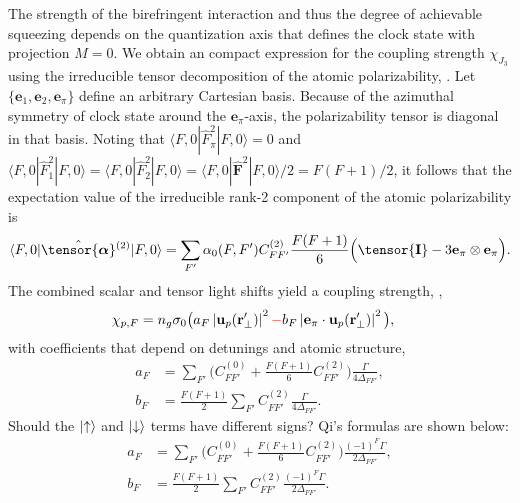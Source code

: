 \documentclass[preprint, aps,pra,onecolumn]{revtex4-1} %
\newcommand{\unittens}{\tensor{\mathbf{I}}}
\newcommand{\poltens}{\hat{\tensor{\boldsymbol{\alpha}}}}
\newcommand{\qaxis}{\mathbf{e}_\pi}
\newcommand{\chieff}{\chi_{J_3}}
\newcommand{\comment}[1]{{\color{Maroon} #1}}
\newcommand{\error}[1]{{\color{red} #1}}
\begin{document}
The strength of the birefringent interaction and thus the degree of achievable squeezing depends on the quantization axis that defines the clock state with projection $M=0$.  We obtain an compact expression for the coupling strength $\chieff$ using the irreducible tensor decomposition of the atomic polarizability, .  
Let $\{\mathbf{e}_1,\mathbf{e}_2, \mathbf{e}_\pi\}$ define an arbitrary Cartesian basis.  Because of the azimuthal symmetry of clock state around the $\qaxis$-axis, the polarizability tensor is diagonal in that basis.  
Noting that $\langle F,0 | \hat{F}_{\pi}^2| F,0 \rangle =0$ and $\langle F,0 | \hat{F}_{1}^2| F,0 \rangle = \langle F,0 | \hat{F}_{2}^2| F,0 \rangle = \langle F,0 | \hat{\mathbf{F}}^2| F,0 \rangle /2 =F(F+1)/2$, it follows that the expectation value of the irreducible rank-2 component of the atomic polarizability is
	\begin{align} \label{Eq::CouplingAngleMagic}
		\langle F,0 | \poltens \phantom{}^{(2)}| F,0 \rangle = \sum_{F'} \alpha_0(F,F') C^{(2)}_{FF'} \frac{F(F+1)}{6} \Big( \unittens - 3\qaxis \otimes \qaxis \Big).
	\end{align}
The combined scalar and tensor light shifts yield a coupling strength, ,
	\begin{align}
		\chi_{p,F} &  = n_g \sigma_0 \big(  a_{F} \left|\mathbf{u}_p(\br'_\perp)\right|^2 \error{-} b_{F} \left|\mathbf{e}_\pi \cdot \mathbf{u}_p(\br'_\perp)\right|^2 \big), \label{Eq::ClockStateCoupling}
	\end{align}
with coefficients that depend on detunings and atomic structure,
	\begin{align}
		a_F &= \sum_{F'}  \Big(C^{(0)}_{FF'} + \frac{F(F+1)}{6} C^{(2)}_{FF'} \Big) \frac{\Gamma}{4 \Delta_{FF'}},\\
		b_F &= \frac{F(F+1)}{2}\sum_{F'} C^{(2)}_{FF'}  \frac{\Gamma}{4 \Delta_{FF'}}.
	\end{align}
\comment{Should the $ \lvert{\uparrow}\rangle $ and $ \lvert{\downarrow}\rangle $ terms have different signs? Qi's formulas are shown below:
\begin{align}
		a_F &= \sum_{F'}  \Big(C^{(0)}_{FF'} + \frac{F(F+1)}{6} C^{(2)}_{FF'} \Big) \frac{(-1)^F\Gamma}{2 \Delta_{FF'}},\\
		b_F &= \frac{F(F+1)}{2}\sum_{F'} C^{(2)}_{FF'}  \frac{(-1)^F\Gamma}{2 \Delta_{FF'}}.
	\end{align}}
\end{document}
